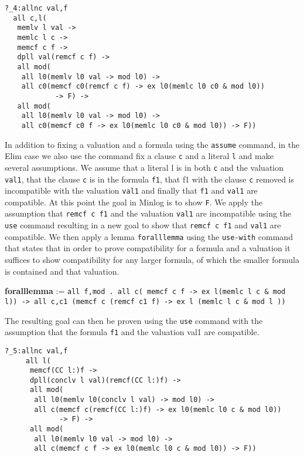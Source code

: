 \begin{lstlisting}[caption = "The Elim Case in Minlog"]
?_4:allnc val,f
  all c,l(
   memlv l val ->
   memlc l c ->
   memcf c f ->
   dpll val(remcf c f) ->
   all mod(
    all l0(memlv l0 val -> mod l0) ->
    all c0(memcf c0(remcf c f) -> ex l0(memlc l0 c0 & mod l0)) 
            -> F) ->
   all mod(
    all l0(memlv l0 val -> mod l0) ->
    all c0(memcf c0 f -> ex l0(memlc l0 c0 & mod l0)) -> F))
\end{lstlisting}
In addition to fixing a valuation and a formula using the \texttt{assume} command, in the Elim case we also use the command fix a clause \texttt{c} and a literal \texttt{l} and make several assumptions. We assume that a literal l is in both \texttt{c} and the valuation \texttt{val1}, that the clause \texttt{c} is in the formula \texttt{f1}, that f1 with the clause \texttt{c} removed is incompatible with the valuation \texttt{val1} and finally that \texttt{f1} and \texttt{val1} are compatible. At this point the goal in Minlog is to show \texttt{F}. We apply the assumption that \texttt{remcf c f1} and the valuation \texttt{val1} are incompatible using the \texttt{use} command resulting in a new goal to show that \texttt{remcf c f1} and \texttt{val1} are compatible. We then apply a lemma \texttt{foralllemma} using the \texttt{use-with} command that states that in order to prove compatibility for a formula and a valuation it suffices to show compatibility for any larger formula, of which the smaller formula is contained and that valuation.

\begin{center}
\textbf{foralllemma} := \texttt{all f,mod . all c( memcf c f -> ex l(memlc l c \& mod l)) -> all c,c1 (memcf c (remcf c1 f) -> ex l (memlc l c \&  mod l ))} \\
\end{center}

The resulting goal can then be proven using the \texttt{use} command with the assumption that the formula \texttt{f1} and the valuation {val1} are compatible.


\begin{lstlisting}[caption = "The Unit Case in Minlog"]
?_5:allnc val,f
     all l(
      memcf(CC l:)f ->
      dpll(conclv l val)(remcf(CC l:)f) ->
      all mod(
       all l0(memlv l0(conclv l val) -> mod l0) ->
       all c(memcf c(remcf(CC l:)f) -> ex l0(memlc l0 c & mod l0)) 
             -> F) ->
      all mod(
       all l0(memlv l0 val -> mod l0) ->
       all c(memcf c f -> ex l0(memlc l0 c & mod l0)) -> F))
\end{lstlisting}

